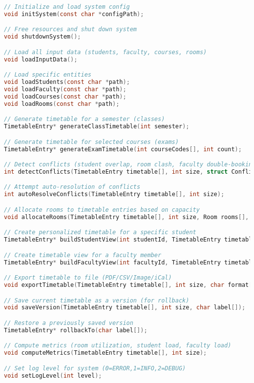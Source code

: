 \documentclass[a4paper,12pt]{article}
\begin{document}
\begin{lstlisting}[language=C, caption={Function Declarations for the Timetable System}]
// Initialize and load system config
void initSystem(const char *configPath);

// Free resources and shut down system
void shutdownSystem();

// Load all input data (students, faculty, courses, rooms)
void loadInputData();

// Load specific entities
void loadStudents(const char *path);
void loadFaculty(const char *path);
void loadCourses(const char *path);
void loadRooms(const char *path);

// Generate timetable for a semester (classes)
TimetableEntry* generateClassTimetable(int semester);

// Generate timetable for selected courses (exams)
TimetableEntry* generateExamTimetable(int courseCodes[], int count);

// Detect conflicts (student overlap, room clash, faculty double-booking)
int detectConflicts(TimetableEntry timetable[], int size, struct ConflictDetail conflicts[]);

// Attempt auto-resolution of conflicts
int autoResolveConflicts(TimetableEntry timetable[], int size);

// Allocate rooms to timetable entries based on capacity
void allocateRooms(TimetableEntry timetable[], int size, Room rooms[], int roomCount);

// Create personalized timetable for a specific student
TimetableEntry* buildStudentView(int studentId, TimetableEntry timetable[], int size);

// Create timetable view for a faculty member
TimetableEntry* buildFacultyView(int facultyId, TimetableEntry timetable[], int size);

// Export timetable to file (PDF/CSV/Image/iCal)
void exportTimetable(TimetableEntry timetable[], int size, char format[]);

// Save current timetable as a version (for rollback)
void saveVersion(TimetableEntry timetable[], int size, char label[]);

// Restore a previously saved version
TimetableEntry* rollbackTo(char label[]);

// Compute metrics (room utilization, student load, faculty load)
void computeMetrics(TimetableEntry timetable[], int size);

// Set log level for system (0=ERROR,1=INFO,2=DEBUG)
void setLogLevel(int level);
\end{lstlisting}
\end{document}
